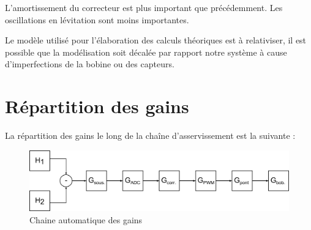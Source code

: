\documentclass[11pt, french]{article} %
\begin{document}
L'amortissement du correcteur est plus important que précédemment. Les oscillations en lévitation sont moins importantes.

Le modèle utilisé pour l'élaboration des calculs théoriques est à relativiser, il est possible que la modélisation soit décalée par rapport notre système à cause d'imperfections de la bobine ou des capteurs.

%
%
%
%
%
%


\section{Répartition des gains}

La répartition des gains le long de la chaîne d'asservissement est la suivante :
\begin{figure}[h!]
	\centering
	\includegraphics[width = 16cm]{SolutionNumerique/Gain.png} 
	\caption{Chaine automatique des gains}
\end{figure}

\pagebreak
\end{document}
